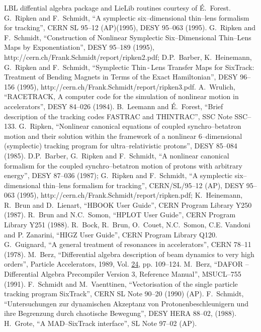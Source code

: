 \documentclass[a4paper,11pt]{report}
\begin{document}
\begin{thebibliography}{99}
%
 LBL diffential algebra package and LieLib routines
  courtesy of \'{E}.~Forest. 
%
 G.~Ripken and F.~Schmidt, ``A symplectic
  six--dimensional thin--lens formalism for tracking'', CERN SL 95--12
  (AP)(1995), DESY 95--063 (1995).  
  G.~Ripken and F.~Schmidt, ``Construction of Nonlinear Symplectic
  Six--Dimensional Thin--Lens Maps by Exponentiation'', DESY 95--189
  (1995),
  {http://cern.ch/Frank.Schmidt/report/ripken2.pdf}; D.P.~Barber,
  K.~Heinemann, G.~Ripken and F.~Schmidt, ``Symplectic Thin\,-\,Lens
  Transfer Maps for SixTrack: Treatment of Bending Magnets in Terms of
  the Exact Hamiltonian'', DESY 96--156 (1995),
  {http://cern.ch/Frank.Schmidt/report/ripken3.pdf}.  
%
 A.~Wrulich, ``RACETRACK, A computer code for the
  simulation of nonlinear motion in accelerators'', DESY 84--026
  (1984).  
%
 B.~Leemann and \'{E}.~Forest, ``Brief
  description of the tracking codes FASTRAC and THINTRAC'', SSC Note
  SSC--133.  
%
 G.~Ripken, ``Nonlinear canonical
  equations of coupled synchro--betatron motion and their solution
  within the framework of a nonlinear 6--dimensional (symplectic)
  tracking program for ultra--relativistic protons'', DESY 85--084
  (1985).  
%
 D.P.~Barber, G.~Ripken and F.~Schmidt,
  ``A nonlinear canonical formalism for the coupled
  synchro--betatron motion of protons with arbitrary energy'', DESY
  87--036 (1987); G.~Ripken and F.~Schmidt, ``A symplectic
  six--dimensional thin--lens formalism for tracking'', CERN/SL/95--12
  (AP), DESY 95--063 (1995),
  {http://cern.ch/Frank.Schmidt/report/ripken.pdf}; K.~Heinemann,
%
  R.~Brun and D.~Lienart, ``HBOOK User Guide'', CERN Program Library
  Y250 (1987).  
%
 R.~Brun and N.C.~Somon, ``HPLOT User
  Guide'', CERN Program Library Y251 (1988).  
%
 R.~Bock,
  R.~Brun, O.~Couet, N.C.~Somon, C.E. Vandoni and P. Zanarini, ``HIGZ
  User Guide'', CERN Program Library Q120.  
%
  G.~Guignard, ``A general treatment of resonances in accelerators'',
  CERN 78--11 (1978).  
%
 M.~Berz, ``Differential
  algebra description of beam dynamics to very high orders'', Particle
  Accelerators, 1989, Vol. \underline{24}, pp. 109--124.
%
 M.~Berz, ``DAFOR -- Differential Algebra Precompiler
  Version 3, Reference Manual'', MSUCL--755 (1991).
%
 F.~Schmidt and M.~Vaenttinen, ``Vectorisation of the
  single particle tracking program SixTrack'', CERN SL Note 90--20
  (1990) (AP).  
%
 F.~Schmidt, ``Untersuchungen zur dynamischen
  Akzeptanz von Protonenbeschleunigern und ihre Begrenzung durch
  chaotische Bewegung'', DESY HERA 88--02, (1988).  
%
%
 H.~Grote, ``A MAD--SixTrack interface'', SL Note
  97--02 (AP).  


\end{thebibliography}
\end{document}
